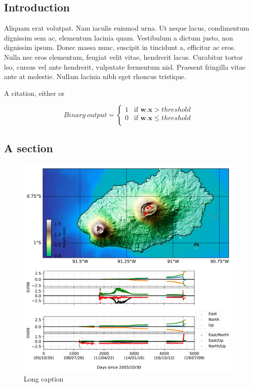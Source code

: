 \onehalfspacing
\begin{refsection}
\chapter[Introduction]{Introduction}
\label{ch:introduction}

Aliquam erat volutpat. Nam iaculis euismod urna. Ut neque lacus, condimentum dignissim sem ac, elementum lacinia quam. Vestibulum a dictum justo, non dignissim ipsum. Donec massa nunc, suscipit in tincidunt a, efficitur ac eros. Nulla nec eros elementum, feugiat velit vitae, hendrerit lacus. Curabitur tortor leo, cursus vel ante hendrerit, vulputate fermentum nisl. Praesent fringilla vitae ante at molestie. Nullam lacinia nibh eget rhoncus tristique.

A citation, either \citep{Massonet1998} or \citet{Massonet1998}

\begin{equation}
	Binary \ output =
  \begin{cases}
    1 & \text{if $\textbf{w}.\textbf{x}  > threshold$}\\
    0 & \text{if $\textbf{w}.\textbf{x} \leq threshold$}\\
  \end{cases}
\end{equation}


\section{A section}
\label{sec:volcano_monitoring_and_insar}


\begin{figure}[tbp]
	\centering
	\includegraphics[width=1\textwidth]{./front_material_figures/figure_3_sn_gps.png}
	\caption[Short Caption]{Long caption}
	\label{fig:population_volcanoes}
\end{figure}






\end{refsection}

